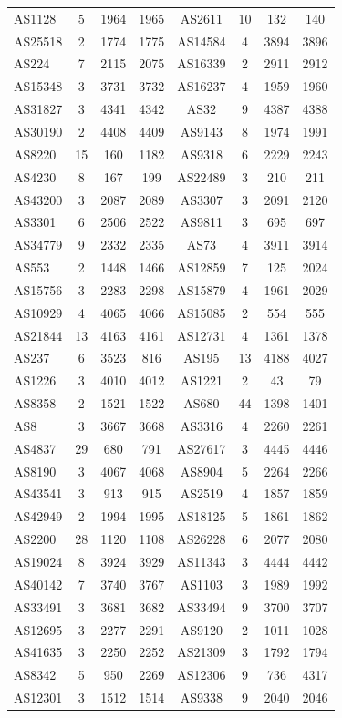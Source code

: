 \documentclass[10pt,journal,compsoc]{IEEEtran}
\begin{document}
\begin{table}[ht]
{\begin{tabular}{lc|cc||cc||cc}
AS1128 & 5&1964 &1965& 
AS2611 &10 &132 &140\\
AS25518& 2& 1774& 1775&
AS14584 & 4&3894 &3896 \\
AS224&7 & 2115 &2075&
AS16339& 2& 2911& 2912\\
AS15348& 3& 3731 &3732&
AS16237 &4 &1959 &1960\\
AS31827& 3& 4341 &4342&
AS32&9 & 4387 &4388\\
AS30190& 2& 4408 &4409&
AS9143 & 8&1974 &1991\\
AS8220 & 15&160& 1182&
AS9318 & 6&2229& 2243 \\
AS4230 & 8&167& 199&
AS22489 & 3&210& 211\\
AS43200& 3& 2087& 2089&
AS3307 & 3&2091 &2120\\
AS3301& 6& 2506 &2522&
AS9811 & 3&695 &697\\
AS34779& 9& 2332 &2335&
AS73& 4& 3911 &3914\\
AS553 &2 &1448 &1466& 
AS12859&7 & 125 &2024\\
AS15756& 3& 2283 &2298&
AS15879& 4& 1961 &2029\\
AS10929& 4& 4065& 4066& 
AS15085& 2& 554 &555\\
AS21844& 13& 4163 &4161&
AS12731& 4& 1361 &1378\\
AS237 & 6&3523 &816&
AS195 & 13&4188& 4027\\
AS1226& 3& 4010& 4012& 
AS1221& 2& 43 &79\\
AS8358& 2& 1521& 1522& 
AS680 & 44&1398 &1401\\
AS8&3 & 3667& 3668&
AS3316&4 & 2260 &2261 \\
AS4837 &29 &680 &791&
AS27617& 3& 4445& 4446\\
AS8190& 3& 4067& 4068&
AS8904& 5& 2264 &2266\\
AS43541& 3& 913 &915& 
AS2519& 4& 1857& 1859\\
AS42949& 2& 1994& 1995& 
AS18125& 5& 1861 &1862\\
AS2200 & 28&1120 &1108&
AS26228& 6& 2077 &2080\\
AS19024& 8& 3924 &3929&
AS11343& 3& 4444 &4442\\
AS40142& 7& 3740 &3767&
AS1103 & 3&1989& 1992\\
AS33491& 3&3681& 3682&
AS33494 & 9&3700 &3707\\
AS12695& 3& 2277& 2291&
AS9120 & 2&1011 &1028\\
AS41635& 3& 2250 &2252& 
AS21309 &3 &1792 &1794\\
AS8342 & 5&950 &2269&
AS12306 & 9&736 &4317\\
AS12301 & 3&1512 &1514&
AS9338& 9& 2040 &2046\\
\hline
\end{tabular}
}
\label{table:W2_0}
\end{table}
\end{document}
